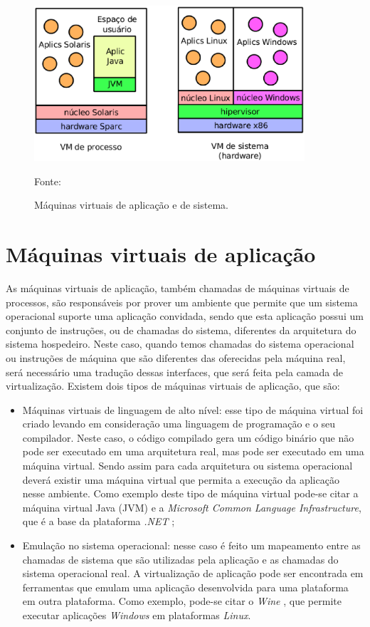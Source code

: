 \begin{figure}[vms_tipos]
 \centering
 \includegraphics[width=380px]{img/vms_tipos.eps}
 \caption{Máquinas virtuais de aplicação e de sistema.}
 \label{fig:vms_tipos}
 Fonte: \citet{laureano2008}
\end{figure}

\section{Máquinas virtuais de aplicação}
\label{section:virtaplicacao}

As máquinas virtuais de aplicação, também chamadas de máquinas virtuais de processos, são responsáveis por prover um ambiente que permite 
que um sistema operacional suporte uma aplicação convidada, sendo que esta aplicação possui um conjunto de instruções, ou de chamadas
do sistema, diferentes da arquitetura do sistema hospedeiro. Neste caso, quando temos chamadas do sistema operacional ou instruções de máquina 
que são diferentes das oferecidas pela máquina real, será necessário uma tradução dessas interfaces, que será feita pela camada de 
virtualização. Existem dois tipos de máquinas virtuais de aplicação, que são:

\begin{itemize}
 \item Máquinas virtuais de linguagem de alto nível: esse tipo de máquina virtual foi criado levando em consideração uma linguagem de 
 programação e o seu compilador. Neste caso, o código compilado gera um código binário que não pode ser executado em uma arquitetura real, 
 mas pode ser executado em uma máquina virtual. Sendo assim para cada arquitetura ou sistema operacional deverá existir uma máquina virtual que
 permita a execução da aplicação nesse ambiente. Como exemplo deste tipo de máquina virtual pode-se citar a máquina virtual Java (\ac{JVM})
 e a \textit{Microsoft Common Language Infrastructure}, que é a base da plataforma \textit{.NET} \cite{carissimi2008};
 \item Emulação no sistema operacional: nesse caso é feito um mapeamento entre as chamadas de sistema que são utilizadas pela aplicação 
 e as chamadas do sistema operacional real. A virtualização de aplicação pode ser encontrada em ferramentas que emulam uma aplicação 
 desenvolvida para uma plataforma em outra plataforma. Como exemplo, pode-se citar o \textit{Wine} \cite{wine}, que permite executar aplicações 
 \textit{Windows} em plataformas \textit{Linux}.
\end{itemize}

